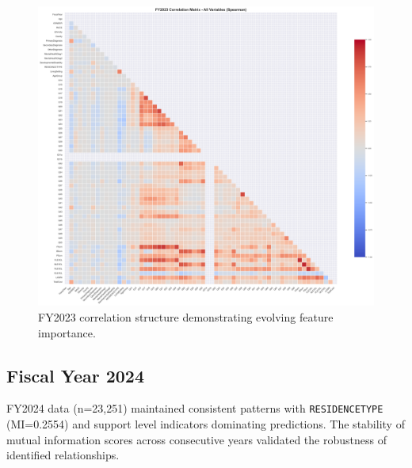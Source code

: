 \begin{figure}[htbp]
    \centering
    \includegraphics[width=\textwidth]{figures/fy2023_correlation_matrix_-_all_variables_(spearman).png}
    \caption{FY2023 correlation structure demonstrating evolving feature importance.}
    \label{fig:fy2023-corr-all}
\end{figure}

\newpage

\subsection{Fiscal Year 2024}
\label{subsec:fy2024}

FY2024 data (n=23,251) maintained consistent patterns with \texttt{RESIDENCETYPE} (MI=0.2554) and support level indicators dominating predictions. The stability of mutual information scores across consecutive years validated the robustness of identified relationships.

